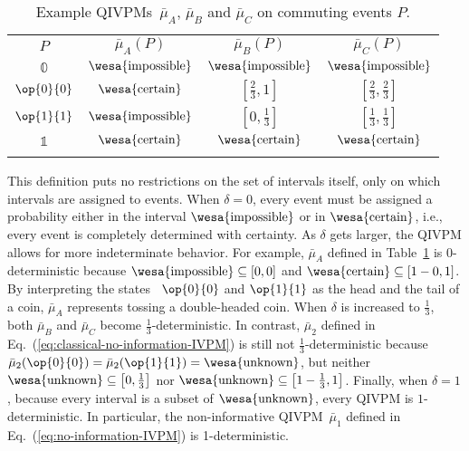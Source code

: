\documentclass[english,reprint, aps, prl,superscriptaddress, showpacs,
showkeys, longbibliography, amsmath, amssymb, floatfix]{revtex4-1}
\theoremstyle{plain}
\theoremstyle{definition}
\newcommand{\imposs}{{\text{\wesa{impossible}}}}
\newcommand{\necess}{{\text{\wesa{certain}}}}
\newcommand{\unknown}{{\text{\wesa{unknown}}}}
\newcommand{\proj}[1]{\op{#1}{#1}}
\begin{document}
\begin{table}
  \noindent \centering{}\caption{\label{tab:classical-IVPMs}Example 
    QIVPMs~$\bar{\mu}_{A}$, $\bar{\mu}_{B}$ and $\bar{\mu}_{C}$ on
    commuting events $P$.}
\begin{tabular}{cccc}
\toprule 
\addlinespace
$P$ & $\bar{\mu}_{A}(P)$ & $\bar{\mu}_{B}(P)$ & $\bar{\mu}_{C}(P)$\tabularnewline\addlinespace
\midrule
\midrule 
\addlinespace
$\mathbb{0}$ & $\imposs$ & $\imposs$ & $\imposs$\tabularnewline\addlinespace
\midrule 
\addlinespace
$\proj{0}$ & $\necess$ & $\left[\frac{2}{3},1\right]$ & $\left[\frac{2}{3},\frac{2}{3}\right]$\tabularnewline\addlinespace
\midrule 
\addlinespace
$\proj{1}$ & $\imposs$ & $\left[0,\frac{1}{3}\right]$ & $\left[\frac{1}{3},\frac{1}{3}\right]$\tabularnewline\addlinespace
\midrule 
\addlinespace
$\mathbb{1}$ & $\necess$ & $\necess$ & $\necess$\tabularnewline\addlinespace
\bottomrule
\end{tabular}
\end{table}

\noindent This definition puts no restrictions on the set of intervals
itself, only on which intervals are assigned to events. When
$\delta=0$, every event must be assigned a probability either in the
interval $\imposs$ or in $\necess$, i.e., every event is completely
determined with certainty. As $\delta$ gets larger, the QIVPM allows
for more indeterminate behavior. For example, $\bar{\mu}_{A}$ defined
in Table~\ref{tab:classical-IVPMs} is $0$-deterministic because
$\imposs\subseteq\left[0,0\right]$ and
$\necess\subseteq\left[1-0,1\right]$.  By interpreting the states
~$\proj{0}$ and $\proj{1}$ as the head and the tail of a coin,
$\bar{\mu}_{A}$ represents tossing a double-headed coin. When $\delta$
is increased to $\frac{1}{3}$, both $\bar{\mu}_{B}$ and
$\bar{\mu}_{C}$ become $\frac{1}{3}$-deterministic. In contrast,
$\bar{\mu}_{2}$ defined in
Eq.~(\ref{eq:classical-no-information-IVPM}) is still not
$\frac{1}{3}$-deterministic because
$\bar{\mu}_{2}(\proj{0})=\bar{\mu}_{2}(\proj{1})=\unknown$, but
neither $\unknown\subseteq\left[0,\frac{1}{3}\right]$ nor
$\unknown\subseteq\left[1-\frac{1}{3},1\right]$.  Finally, when
$\delta=1$, because every interval is a subset of $\unknown$, every
QIVPM is $1$-deterministic. In particular, the non-informative
QIVPM~$\bar{\mu}_{1}$ defined in Eq.~(\ref{eq:no-information-IVPM}) is
1-deterministic.
\end{document}
